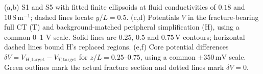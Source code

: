 (a,b) S1 and S5 with fitted finite ellipsoids at fluid conductivities of $0.18$ and $10\,\mathrm{S\,m^{-1}}$; dashed lines locate $y/L=0.5$. (c,d) Potentials $V$ in the fracture-bearing full CT (T) and background-matched peripheral simplification (H), using a common 0--1 V scale. Solid lines are $0.25$, $0.5$ and $0.75\,\mathrm{V}$ contours; horizontal dashed lines bound H's replaced regions. (e,f) Core potential differences $\delta V=V_{H,\mathrm{target}}-V_{T,\mathrm{target}}$ for $z/L=0.25$--$0.75$, using a common $\pm350\,\mathrm{mV}$ scale. Green outlines mark the actual fracture section and dotted lines mark $\delta V=0$.

